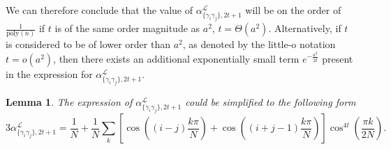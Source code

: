 \documentclass{article}
\newtheorem{lemma}{Lemma}
\newcommand{\alpl}{\alpha_{\{\gamma_i\gamma_j\}, 2t+1}^{\mathscr{L}}}
\begin{document}
We can therefore conclude that the value of $\alpl$ will be on the order of $\frac{1}{\mathrm{poly}(n)}$ if $t$ is of the same order magnitude as $a^2$, $t = \Theta(a^2)$. Alternatively, if $t$ is considered to be of lower order than $a^2$, as denoted by the little-o notation $t = o(a^2)$, then there exists an additional exponentially small term $ e^{-\frac{a^2}{2t}}$ present in the expression for $\alpl$.
\begin{lemma}
\label{lemma: simplification of alpha L}
The expression of $\alpl$ could be simplified to the following form
    \begin{equation}
    \label{eq: alpha L}
        3\alpl=\frac{1}{N}+\frac{1}{N} \sum_k\left[\cos \left((i-j) \frac{k \pi}{N}\right)+\cos \left((i+j-1) \frac{k \pi}{N}\right)\right] \cos ^{4 t}\left(\frac{\pi k}{2 N}\right).
    \end{equation}
\end{lemma}
\end{document}

